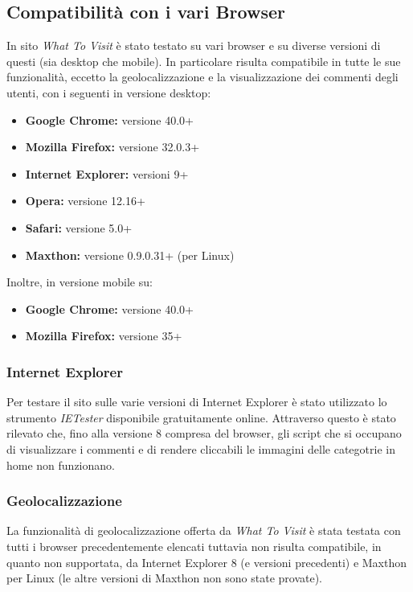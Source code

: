 \subsection{Compatibilità con i vari Browser}
In sito \textit{What To Visit} è stato testato su vari browser e su
diverse versioni di questi (sia desktop che mobile). 
In particolare risulta compatibile in tutte le sue funzionalità, 
eccetto la geolocalizzazione e la visualizzazione dei commenti
degli utenti, con i seguenti in versione desktop:
\begin{itemize}
\item \textbf{Google Chrome:} versione 40.0+ 
\item \textbf{Mozilla Firefox:} versione 32.0.3+
\item \textbf{Internet Explorer:} versioni 9+
\item \textbf{Opera:} versione 12.16+
\item \textbf{Safari:} versione 5.0+
\item \textbf{Maxthon:} versione 0.9.0.31+ (per Linux)
\end{itemize}

Inoltre, in versione mobile su:
\begin{itemize}
\item \textbf{Google Chrome:} versione 40.0+ 
\item \textbf{Mozilla Firefox:} versione 35+  
\end{itemize}

\subsubsection{Internet Explorer}
Per testare il sito sulle varie versioni di Internet Explorer è stato utilizzato lo strumento
\textit{IETester} disponibile gratuitamente online. Attraverso questo è stato rilevato che, fino alla versione 8 compresa del browser, gli script che si occupano di visualizzare i commenti e di rendere cliccabili le immagini delle categotrie in home non funzionano.

\subsubsection{Geolocalizzazione}
La funzionalità di geolocalizzazione offerta da \textit{What To Visit} è stata
testata con tutti i browser precedentemente elencati tuttavia non risulta compatibile,
in quanto non supportata, da Internet Explorer 8 (e versioni precedenti) e Maxthon per Linux (le altre versioni di Maxthon non sono state provate).

